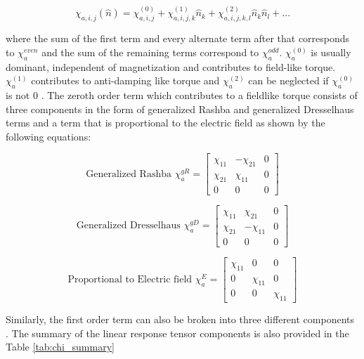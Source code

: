 \documentclass[10pt,doublespacing,edeposit]{uiucthesis2020}
\begin{document}
\begin{mainmatter}
\begin{equation}
\chi_{a,i,j}(\hat{n}) = \chi_{a,i,j}^{(0)} + \chi_{a,i,j,k}^{(1)}\hat{n}_k + \chi_{a,i,j,k,l}^{(2)}\hat{n}_k\hat{n}_l + ...
\end{equation}

where the sum of the first term and every alternate term after that corresponds to $\chi_a^{even}$ and the sum of the remaining terms correspond to $\chi_a^{odd}$. $\chi_a^{(0)}$ is usually dominant, independent of magnetization and contributes to field-like torque. $\chi_a^{(1)}$ contributes to anti-damping like torque and $\chi_a^{(2)}$ can be neglected if $\chi_a^{(0)}$ is not 0 \cite{Zelezny2017}. The zeroth order term which contributes to a fieldlike torque consists of three components in the form of generalized Rashba and generalized Dresselhaus terms and a term that is proportional to the electric field as shown by the following equations:

\begin{equation}
\text{Generalized Rashba } \chi_a^{gR} = \begin{bmatrix} \chi_{11} & -\chi_{21} & 0 \\ \chi_{21} & \chi_{11} & 0 \\ 0 & 0 & 0 \end{bmatrix}
\end{equation}

\begin{equation}
\text{Generalized Dresselhaus } \chi_a^{gD} = \begin{bmatrix} \chi_{11} & \chi_{21} & 0 \\ \chi_{21} & -\chi_{11} & 0 \\ 0 & 0 & 0 \end{bmatrix}
\end{equation}

\begin{equation}
\text{Proportional to Electric field } \chi_a^{E} = \begin{bmatrix} \chi_{11} & 0 & 0 \\ 0 & \chi_{11} & 0 \\ 0 & 0 & \chi_{11} \end{bmatrix}
\end{equation}



Similarly, the first order term can also be broken into three different components \cite{Zelezny2017}. The summary of the linear response tensor components is also provided in the Table \ref{tab:chi_summary}


\end{mainmatter}
\end{document}
